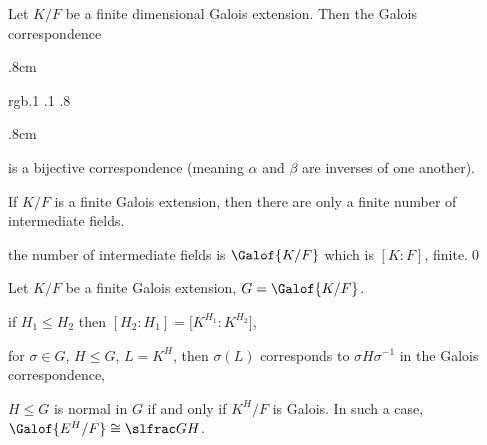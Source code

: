 \bthrm[title=The Fundamental Theorem of Galois Theory, name=ftogt]

    Let $K/F$ be a finite dimensional Galois extension.
    Then the Galois correspondence

    \kern.8cm
    \centerline{\color rgb{.1 .1 .8}}
    \kern.8cm

    is a bijective correspondence (meaning $\alpha$ and $\beta$ are inverses of one another).

\ethrm

\bcoro

    If $K/F$ is a finite Galois extension, then there are only a finite number of intermediate fields.

\ecoro

\Proof the number of intermediate fields is $\Galof{K/F}$ which is $[K:F]$, finite.\qed

\bcoro[name=galoisproperties]

    Let $K/F$ be a finite Galois extension, $G=\Galof{K/F}$.
    \benum
        \item if $H_1\leq H_2$ then $[H_2:H_1]=\bigl[K^{H_1}:K^{H_2}\bigr]$,
        \item for $\sigma\in G$, $H\leq G$, $L=K^H$, then $\sigma(L)$ corresponds to $\sigma H\sigma^{-1}$ in the Galois correspondence,
        \item $H\leq G$ is normal in $G$ if and only if $K^H/F$ is Galois.
        In such a case, $\Galof{E^H/F}\cong\slfrac GH$.
    \eenum

\ecoro

